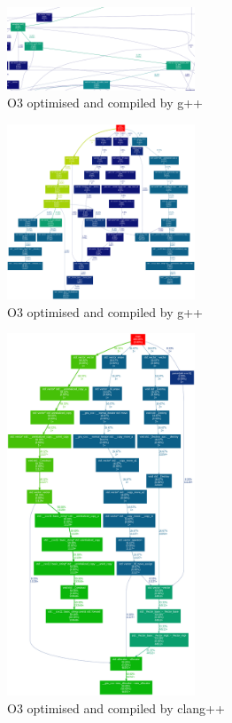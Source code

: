 \begin{figure}[H]
\begin{center}
\leavevmode
\includegraphics[width=0.5\textwidth]{output_o3optimised3_crop_parser.png}
\caption{O3 optimised and compiled by g++}
\label{parser}
\end{center}
\end{figure}

\begin{figure}[H]
\begin{center}
\leavevmode
\includegraphics[width=0.5\textwidth]{output_o3optimised5.png}
\caption{O3 optimised and compiled by g++}
\label{parserfix}
\end{center}
\end{figure}
\begin{figure}[H]
\begin{center}
\leavevmode
\includegraphics[width=0.5\textwidth]{output_clango3optimised6.png}
\caption{O3 optimised and compiled by clang++}
\label{parserfix_clang}
\end{center}
\end{figure}
